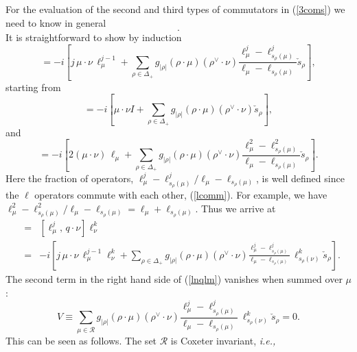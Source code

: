 \documentclass[a4paper,12pt]{article}
\begin{document}
For the evaluation of the second and third types of commutators
in (\ref{3coms}) we need to know in general
\begin{equation}
[\ell_\mu^n\,, \,q\cdot\!\nu\,\ell_\nu^m].
\end{equation}
It is straightforward to show by induction
\begin{equation}
    [\ell^j_\mu,\,q\cdot\!\nu]=-i\left[j\,\mu\cdot\nu \,\ell_\mu^{j-1}
    +\sum_{\rho\in\Delta_+}g_{|\rho|}(\rho\cdot\mu)(\rho^\vee\!\cdot\nu)
     \frac{\ell_\mu^j-\ell^j_{s_\rho(\mu)}}
      {\ell_\mu-\ell_{s_{\rho}(\mu)}}\check{s}_\rho\right],
\label{ind}
\end{equation}
starting from
\begin{equation}
[\ell_\mu,\,q\cdot\!\nu]=-i\left[\mu\cdot\nu I
+\sum_{\rho\in\Delta_+}g_{|\rho|}(\rho\cdot\mu)
(\rho^\vee\!\cdot\nu)\check{s}_\rho\right],
\end{equation}
and
\begin{equation}
 [\ell^2_\mu,\,q\cdot\!\nu]=-i\left[2(\mu\cdot\nu)\, \ell_\mu
+\sum_{\rho\in\Delta_+}g_{|\rho|}(\rho\cdot\mu)(\rho^\vee\!\cdot\nu)
       \frac{\ell_\mu^2-\ell^2_{s_\rho(\mu)}}
     {\ell_\mu-\ell_{s_{\rho}(\mu)}}\check{s}_\rho\right].
\end{equation}
Here the fraction of operators,
$\ell_\mu^j-\ell^j_{s_\rho(\mu)}/{\ell_\mu-\ell_{s_{\rho}(\mu)}}$,
is well defined since the $\ell$ operators commute with each other,
(\ref{lcomm}). For example, we have
$\ell_\mu^2-\ell^2_{s_\rho(\mu)}/{\ell_\mu-\ell_{s_{\rho}(\mu)}}
=\ell_\mu+\ell_{s_{\rho}(\mu)}$.
Thus we arrive at
\begin{eqnarray}
   [\ell^j_\mu,\,q\cdot\!\nu\,\ell^k_\nu]&=
   &[\ell^j_\mu,\,q\cdot\!\nu]\ell^k_\nu\nonumber\\
   &=&-i\left[j\,\mu\cdot\nu \,\ell_\mu^{j-1}\ell^k_\nu
   +\sum_{\rho\in\Delta_+}g_{|\rho|}(\rho\cdot\mu)(\rho^\vee\!\cdot\nu)
   \frac{\ell_\mu^j-\ell^j_{s_\rho(\mu)}}
{\ell_\mu-\ell_{s_{\rho}(\mu)}}
\,\ell^k_{s_{\rho}(\nu)}\check{s}_\rho\right].
   \label{lnqlm}
\end{eqnarray}
The second term in
the right hand side of (\ref{lnqlm}) vanishes when summed over $\mu$:
\begin{equation}
   V\equiv\sum_{\mu\in{\mathcal R}}
   g_{|\rho|}(\rho\cdot\mu)(\rho^\vee\!\cdot\nu)
   \frac{\ell_\mu^j-\ell_{s_\rho(\mu)}^j}
   {\ell_\mu-\ell_{s_\rho(\mu)}}\,
   \ell^k_{s_\rho(\nu)}\check{s}_\rho=0.
   \label{vvani}
\end{equation}
This can be seen as follows.
The set ${\mathcal R}$ is Coxeter invariant, {\em i.e.,\/}
\end{document}
